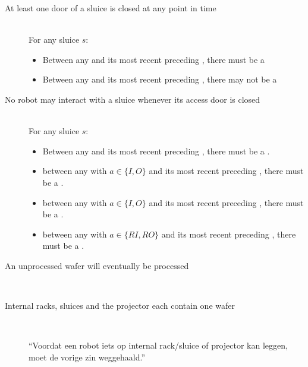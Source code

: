 
\begin{description}
 \item[At least one door of a sluice is closed at any point in time] \hfill \\
 For any sluice $s$:
 \begin{itemize}
  \item Between any  and its most recent preceding , there must be a 
  \item Between any  and its most recent preceding , there may not be a 
 \end{itemize}

 \item[No robot may interact with a sluice whenever its access door is closed] \hfill \\
For any sluice $s$:

\begin{itemize}
	\item Between any  and its most recent preceding , there must be a .
	\item between any  with $a \in \{ I, O \}$ and its most recent preceding , there must be a .
	\item between any  with $a \in \{ I, O \}$ and its most recent preceding , there must be a .
	\item between any  with $a \in \{ RI, RO \}$ and its most recent preceding , there must be a .
\end{itemize}
 
 \item[An unprocessed wafer will eventually be processed] \hfill \\
 
 
 
 \item[Internal racks, sluices and the projector each contain one wafer] \hfill \\
 
 ``Voordat een robot iets op internal rack/sluice of projector kan leggen, moet de vorige zin weggehaald.''
 

\end{description}
